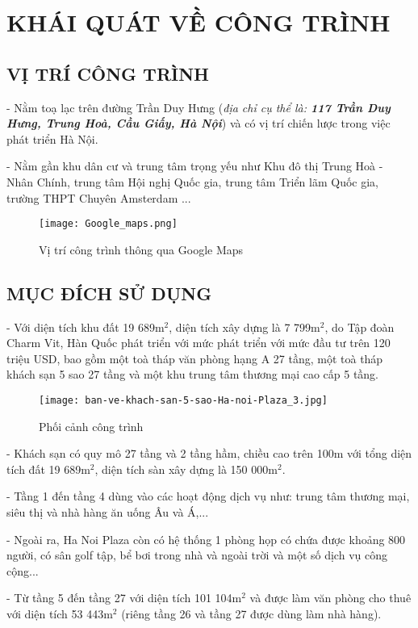 \fancyhead[L]{\leftmark}

	\section{KHÁI QUÁT VỀ CÔNG TRÌNH}
	\subsection{VỊ TRÍ CÔNG TRÌNH}
	- Nằm toạ lạc trên đường Trần Duy Hưng (\emph{địa chỉ cụ thể là: \textbf{117 Trần Duy Hưng, Trung Hoà, Cầu Giấy, Hà Nội}}) và có vị trí chiến lược trong việc phát triển Hà Nội.
	
	 - Nằm gần khu dân cư và trung tâm trọng yếu như Khu đô thị Trung Hoà - Nhân Chính, trung tâm Hội nghị Quốc gia, trung tâm Triển lãm Quốc gia, trường THPT Chuyên Amsterdam ...

\begin{figure}[H]
	\centering
	\texttt{[image: Google\_maps.png]}
	\caption{Vị trí công trình thông qua Google Maps}
\end{figure}
	
	\subsection{MỤC ĐÍCH SỬ DỤNG}
	- Với diện tích khu đất 19 689m$^{2}$, diện tích xây dựng là 7 799m$^{2}$, do Tập đoàn Charm Vit, Hàn Quốc phát triển với mức phát triển với mức đầu tư trên 120 triệu USD, bao gồm một toà tháp văn phòng hạng A 27 tầng, một toà tháp khách sạn 5 sao 27 tầng và một khu trung tâm thương mại cao cấp 5 tầng.

\begin{figure}[H]
	\centering
	\texttt{[image: ban-ve-khach-san-5-sao-Ha-noi-Plaza\_3.jpg]}
	\caption{Phối cảnh công trình}
\end{figure}

	- Khách sạn có quy mô 27 tầng và 2 tầng hầm, chiều cao trên 100m với tổng diện tích đất 19 689m$^{2}$, diện tích sàn xây dựng là 150 000m$^{2}$.
	
	- Tầng 1 đến tầng 4 dùng vào các hoạt động dịch vụ như: trung tâm thương mại, siêu thị và nhà hàng ăn uống Âu và Á,...
	
	- Ngoài ra, Ha Noi Plaza còn có hệ thống 1 phòng họp có chứa được khoảng 800 người, có sân golf tập, bể bơi trong nhà và ngoài trời và một số dịch vụ công cộng...
		
	- Từ tầng 5 đến tầng 27 với diện tích 101 104m$^{2}$ và được làm văn phòng cho thuê với diện tích 53 443m$^{2}$ (riêng tầng 26 và tầng 27 được dùng làm nhà hàng).	
		
